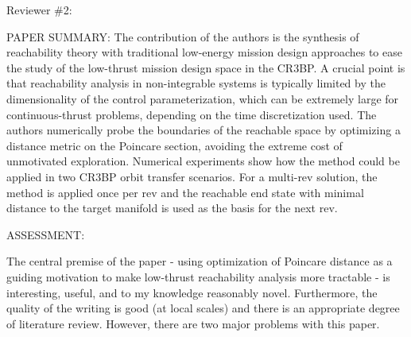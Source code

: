 \documentclass[11pt]{article}
\begin{document}
\begin{itshape}
Reviewer \#2: 

PAPER SUMMARY:
The contribution of the authors is the synthesis of reachability theory with traditional low-energy mission design approaches to ease the study of the low-thrust mission design space in the CR3BP.  A crucial point is that reachability analysis in non-integrable systems is typically limited by the dimensionality of the control parameterization, which can be extremely large for continuous-thrust problems, depending on the time discretization used.  The authors numerically probe the boundaries of the reachable space by optimizing a distance metric on the Poincare section, avoiding the extreme cost of unmotivated exploration.  Numerical experiments show how the method could be applied in two CR3BP orbit transfer scenarios.  For a multi-rev solution, the method is applied once per rev and the reachable end state with minimal distance to the target manifold is used as the basis for the next rev.

ASSESSMENT:

The central premise of the paper - using optimization of Poincare distance as a guiding motivation to make low-thrust reachability analysis more tractable - is interesting, useful, and to my knowledge reasonably novel.  Furthermore, the quality of the writing is good (at local scales) and there is an appropriate degree of literature review.  However, there are two major problems with this paper.
\end{itshape}
\end{document}
